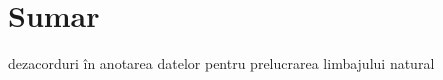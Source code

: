 \manualmark
{}

\chapter*{Sumar}

dezacorduri în anotarea datelor pentru prelucrarea limbajului natural